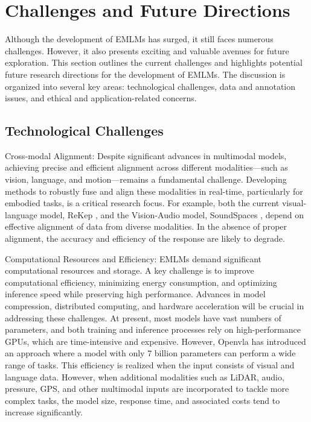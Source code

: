 \section{Challenges and Future Directions}
\label{sec:CFD}
Although the development of EMLMs has surged, it still faces numerous challenges. However, it also presents exciting and valuable avenues for future exploration. This section outlines the current challenges and highlights potential future research directions for the development of EMLMs. The discussion is organized into several key areas: technological challenges, data and annotation issues, and ethical and application-related concerns.

\subsection{Technological Challenges}
Cross-modal Alignment: Despite significant advances in multimodal models, achieving precise and efficient alignment across different modalities—such as vision, language, and motion—remains a fundamental challenge. Developing methods to robustly fuse and align these modalities in real-time, particularly for embodied tasks, is a critical research focus. For example, both the current visual-language model, ReKep \cite{huang2024rekep}, and the Vision-Audio model, SoundSpaces \cite{chen2020soundspaces}, depend on effective alignment of data from diverse modalities. In the absence of proper alignment, the accuracy and efficiency of the response are likely to degrade.

Computational Resources and Efficiency: EMLMs demand significant computational resources and storage. A key challenge is to improve computational efficiency, minimizing energy consumption, and optimizing inference speed while preserving high performance. Advances in model compression, distributed computing, and hardware acceleration will be crucial in addressing these challenges. At present, most models have vast numbers of parameters, and both training and inference processes rely on high-performance GPUs, which are time-intensive and expensive. However, Openvla \cite{kim2024openvla} has introduced an approach where a model with only 7 billion parameters can perform a wide range of tasks. This efficiency is realized when the input consists of visual and language data. However, when additional modalities such as LiDAR, audio, pressure, GPS, and other multimodal inputs are incorporated to tackle more complex tasks, the model size, response time, and associated costs tend to increase significantly.

